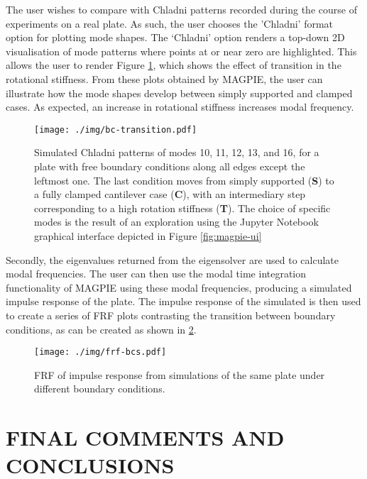 The user wishes to compare with Chladni patterns recorded during the course of experiments on a real plate. As such, the user chooses the 'Chladni' format option for plotting mode shapes. The `Chladni' option renders a top-down 2D visualisation of mode patterns where points at or near zero are highlighted. This allows the user to render Figure \ref{fig:bc_transitions}, which shows the effect of transition in the rotational stiffness.  From these plots obtained by MAGPIE, the user can illustrate how the mode shapes develop between simply supported and clamped cases. As expected, an increase in rotational stiffness increases modal frequency.
\begin{figure}[H]
    \centering
    \texttt{[image: ./img/bc-transition.pdf]}
    \caption{Simulated Chladni patterns of modes 10, 11, 12, 13, and 16, for a plate with free boundary conditions along all edges except the leftmost one. The last condition moves from simply supported (\textbf{S}) to a fully clamped cantilever case (\textbf{C}), with an intermediary step corresponding to a high rotation stiffness (\textbf{T}). The choice of specific modes is the result of an exploration using the Jupyter Notebook graphical interface depicted in Figure \ref{fig:magpie-ui} }
    \label{fig:bc_transitions}
\end{figure}
Secondly, the eigenvalues returned from the eigensolver are used to calculate modal frequencies. The user can then use the modal time integration functionality of MAGPIE using these modal frequencies, producing a simulated impulse response of the plate. The impulse response of the simulated is then used to create a series of FRF plots contrasting the transition between boundary conditions, as can be created as shown in \ref{fig:frf-bcs}.
\begin{figure}[H]
    \centering
    \texttt{[image: ./img/frf-bcs.pdf]}
    \caption{FRF of impulse response from simulations of the same plate under different boundary conditions.}
    \label{fig:frf-bcs}
\end{figure}

\section{FINAL COMMENTS AND CONCLUSIONS}\label{sec:Conclusions}

  
